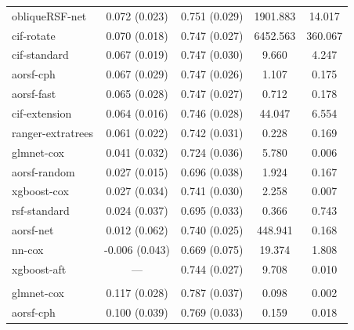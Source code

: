 \documentclass{article}\usepackage[]{graphicx}\usepackage[]{xcolor}
\newenvironment{knitrout}{}{} %
\begin{document}
\begin{knitrout}
\begin{longtable}[t]{lcccc}
\hline
\hspace{1em}obliqueRSF-net & 0.072 (0.023) & 0.751 (0.029) & 1901.883 & 14.017\\
\hspace{1em}cif-rotate & 0.070 (0.018) & 0.747 (0.027) & 6452.563 & 360.067\\
\hspace{1em}cif-standard & 0.067 (0.019) & 0.747 (0.030) & 9.660 & 4.247\\
\hspace{1em}aorsf-cph & 0.067 (0.029) & 0.747 (0.026) & 1.107 & 0.175\\
\hspace{1em}aorsf-fast & 0.065 (0.028) & 0.747 (0.027) & 0.712 & 0.178\\
\hspace{1em}cif-extension & 0.064 (0.016) & 0.746 (0.028) & 44.047 & 6.554\\
\hspace{1em}ranger-extratrees & 0.061 (0.022) & 0.742 (0.031) & 0.228 & 0.169\\
\hspace{1em}glmnet-cox & 0.041 (0.032) & 0.724 (0.036) & 5.780 & 0.006\\
\hspace{1em}aorsf-random & 0.027 (0.015) & 0.696 (0.038) & 1.924 & 0.167\\
\hspace{1em}xgboost-cox & 0.027 (0.034) & 0.741 (0.030) & 2.258 & 0.007\\
\hspace{1em}rsf-standard & 0.024 (0.037) & 0.695 (0.033) & 0.366 & 0.743\\
\hspace{1em}aorsf-net & 0.012 (0.062) & 0.740 (0.025) & 448.941 & 0.168\\
\hspace{1em}nn-cox & -0.006 (0.043) & 0.669 (0.075) & 19.374 & 1.808\\
\hspace{1em}xgboost-aft & --- & 0.744 (0.027) & 9.708 & 0.010\\
\addlinespace[0.3em]
\multicolumn{5}{l}{\textit{\textbf{FCL; death, n = 541, p = 7}}}\\
\hline
\hspace{1em}glmnet-cox & 0.117 (0.028) & 0.787 (0.037) & 0.098 & 0.002\\
\hspace{1em}aorsf-cph & 0.100 (0.039) & 0.769 (0.033) & 0.159 & 0.018\\

\end{longtable}
\end{knitrout}
\end{document}
